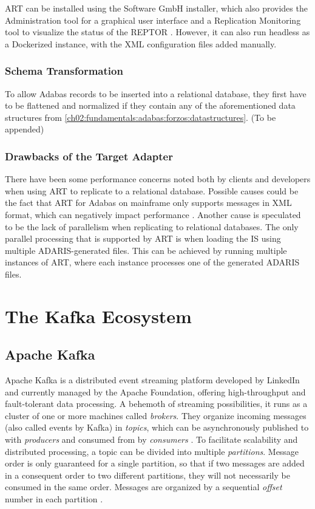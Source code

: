 \ac{ART} can be installed using the Software GmbH installer, which also provides the Administration tool for a graphical user interface and a Replication Monitoring tool to visualize the status of the \ac{REPTOR} \cite{artconcepts}. However, it can also run headless as a Dockerized instance, with the XML configuration files added manually.

\subsubsection{Schema Transformation}
To allow Adabas records to be inserted into a relational database, they first have to be flattened and normalized if they contain any of the aforementioned data structures from \ref{ch02:fundamentals:adabas:forzos:datastructures}. (To be appended)

\subsubsection{Drawbacks of the Target Adapter}
\label{ch02:fundamentals:adabas:art:limitations}
There have been some performance concerns noted both by clients and developers when using \ac{ART} to replicate to a relational database. Possible causes could be the fact that \ac{ART} for Adabas on mainframe only supports messages in XML format, which can negatively impact performance \cite{nicola2003xml}. Another cause is speculated to be the lack of parallelism when replicating to relational databases. The only parallel processing that is supported by \ac{ART} is when loading the \ac{IS} using multiple ADARIS-generated files. This can be achieved by running multiple instances of \ac{ART}, where each instance processes one of the generated ADARIS files.

\section{The Kafka Ecosystem}
\label{ch02:fundamentals:apachekafkaandkafkaconnect}

\subsection{Apache Kafka}
\label{ch02:fundamentals:apachekafkaandkafkaconnect:apachekafka}
Apache Kafka is a distributed event streaming platform developed by LinkedIn and currently managed by the Apache Foundation, offering high-throughput and fault-tolerant data processing. A behemoth of streaming possibilities, it runs as a cluster of one or more machines called \textit{brokers}. They organize incoming messages (also called events by Kafka) in \textit{topics}, which can be asynchronously published to with \textit{producers} and consumed from by \textit{consumers} \cite{peddireddystreamliningprocessingkafka}. To facilitate scalability and distributed processing, a topic can be divided into multiple \textit{partitions}. Message order is only guaranteed for a single partition, so that if two messages are added in a consequent order to two different partitions, they will not necessarily be consumed in the same order. Messages are organized by a sequential \textit{offset} number in each partition \cite{thein2014apache}.

